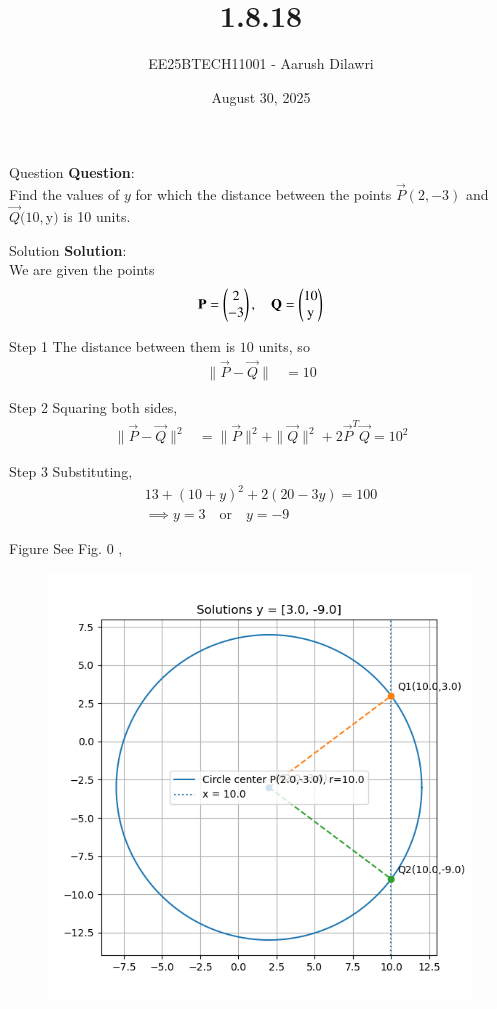 \documentclass{beamer}
\title{1.8.18}
\date{August 30, 2025}
\author{EE25BTECH11001 - Aarush Dilawri}
\begin{document}
\frame{\titlepage}

\begin{frame}{Question}
\textbf{Question}:\\
Find the values of $y$ for which the distance between the points $\vec{P}(2,-3)$ and $\vec{Q}(10,$y$)$ is 10 units.
\end{frame}

\begin{frame}{Solution}
\textbf{Solution}:\\
We are given the points
\begin{align}
\vec{P} = \myvec{2\\-3}, \quad 
\vec{Q} = \myvec{10\\$y$}
\end{align}
\end{frame}

\begin{frame}{Step 1}
The distance between them is $10$ units, so
\begin{align}
\|\vec{P}-\vec{Q}\| &= 10
\end{align}
\end{frame}

\begin{frame}{Step 2}
Squaring both sides,
\begin{align}
\|\vec{P}-\vec{Q}\|^2 &= \|\vec{P}\|^2 + \|\vec{Q}\|^2 + 2\vec{P}^T\vec{Q} = 10^2
\end{align}
\end{frame}

\begin{frame}{Step 3}
Substituting,
\begin{align}
13 + (10 + y)^2 + 2(20 -3y) = 100\\
\implies y = 3 \quad \text{or} \quad y = -9
\end{align}
\end{frame}

\begin{frame}{Figure}
See Fig. 0 ,
\begin{figure}[H]
\begin{center}
\includegraphics[width=0.6\columnwidth]{figs/fig.png}
\end{center}
\caption{}
\label{fig:Fig1}
\end{figure}
\end{frame}
\end{document}

